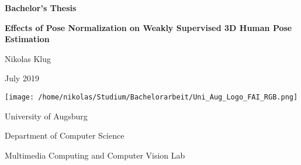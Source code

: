 \begin{titlepage}
	\centering
	
	\large{\textbf{Bachelor's Thesis}}
	\vspace{0.4cm}
	
	\huge{\textbf{Effects of Pose Normalization on Weakly Supervised 3D Human Pose Estimation}}\par
	
	\vspace{1cm}
	\Large{Nikolas Klug}
	
	\vspace{1cm}
	\Large{July 2019}
	
	\vspace{\fill}
	\texttt{[image: /home/nikolas/Studium/Bachelorarbeit/Uni\_Aug\_Logo\_FAI\_RGB.png]}
	\vspace{5mm}
	
	University of Augsburg
	
	Department of Computer Science
	
	Multimedia Computing and Computer Vision Lab
\end{titlepage}

\normalfont
\restoregeometry
\pagebreak

